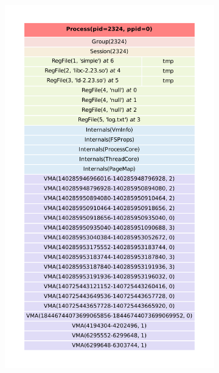 \begin{figure}[ht!]
	\centering
	\begin{subfigure}[b]{0.4\textwidth}
		\includegraphics[width=\textwidth]{fig/exSimpleTree.pdf}
	\end{subfigure}
	\begin{subfigure}[b]{0.5\textwidth}

\end{subfigure}
\end{figure}
